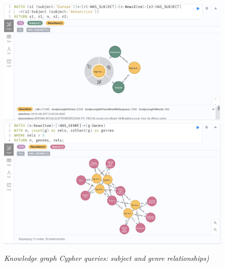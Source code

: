 \documentclass[11pt]{article}
\begin{document}
  \begin{figure}
    \includegraphics[scale=0.2]{00-news-items-antarctica-europe}
    \includegraphics[scale=0.2]{00-news-items-more-than-five-genres}
    \caption{\textit{Knowledge graph Cypher queries: subject and genre relationships)}}
  \end{figure}
\end{document}
